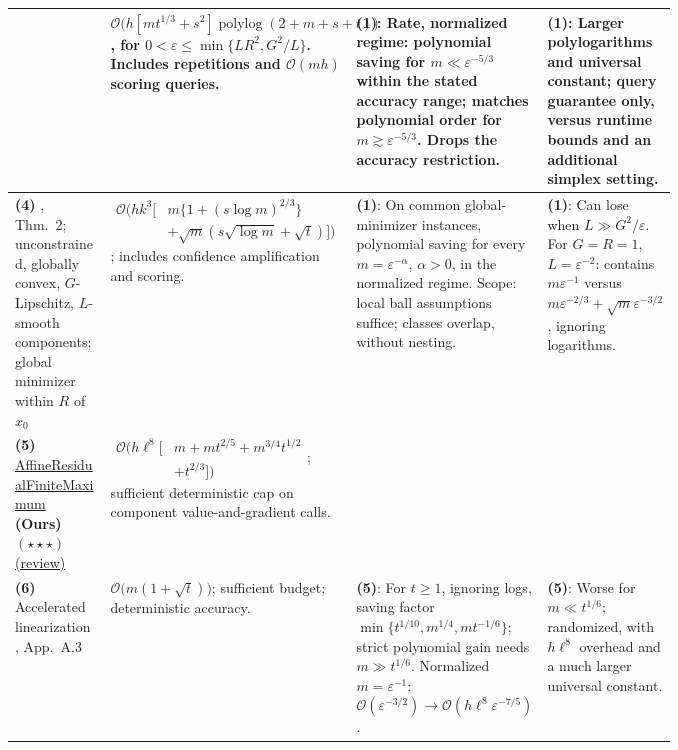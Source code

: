 \begin{table}[tp]
\begin{threeparttable}
\begin{tabularx}{\linewidth}{@{}>{\raggedright\arraybackslash}p{0.20\linewidth}>{\raggedright\arraybackslash}p{0.32\linewidth}>{\raggedright\arraybackslash}p{0.25\linewidth}>{\raggedright\arraybackslash}X@{}}
& $\mathcal{O}\bigl(h[mt^{1/3}+s^2]\operatorname{polylog}(2+m+s+t)\bigr)$, for $0<\varepsilon\le\min\{LR^2,G^2/L\}$. Includes repetitions and $\mathcal{O}(mh)$ scoring queries.
& \textbf{(1)}: Rate, normalized regime: polynomial saving for $m\ll\varepsilon^{-5/3}$ within the stated accuracy range; matches polynomial order for $m\gtrsim\varepsilon^{-5/3}$. Drops the accuracy restriction.
& \textbf{(1)}: Larger polylogarithms and universal constant; query guarantee only, versus runtime bounds and an additional simplex setting. \\
\midrule
\textbf{(4)} \citep{sfmCarmon2021v1}, Thm.~2; unconstrained, globally convex, $G$-Lipschitz, $L$-smooth components; global minimizer within $R$ of $x_0$
& $\begin{aligned}\mathcal{O}\bigl(hk^3[&m\{1+(s\log m)^{2/3}\}\\&+\sqrt m(s\sqrt{\log m}+\sqrt t)]\bigr)\end{aligned}$; includes confidence amplification and scoring.
& \textbf{(1)}: On common global-minimizer instances, polynomial saving for every $m=\varepsilon^{-\alpha}$, $\alpha>0$, in the normalized regime. Scope: local ball assumptions suffice; classes overlap, without nesting.
& \textbf{(1)}: Can lose when $L\gg G^2/\varepsilon$. For $G=R=1$, $L=\varepsilon^{-2}$: contains $m\varepsilon^{-1}$ versus $m\varepsilon^{-2/3}+\sqrt m\varepsilon^{-3/2}$, ignoring logarithms. \\
\midrule
\textbf{(5)} \href{https://github.com/k3nfalt/longtails/blob/main/LongTails/Theorems/AffineResidualFiniteMaximum.lean}{Affine\allowbreak Residual\allowbreak Finite\allowbreak Maximum} \textbf{(Ours)} $(\star\star\star)$ \href{https://github.com/k3nfalt/longtails/blob/main/scripts/reviews/AffineResidualFiniteMaximum.md}{(review)}
& $\begin{aligned}\mathcal{O}\bigl(h\ell^8[&m+mt^{2/5}+m^{3/4}t^{1/2}\\&+t^{2/3}]\bigr)\end{aligned}$; sufficient deterministic cap on component value-and-gradient calls.
& & \\
\midrule
\textbf{(6)} Accelerated linearization \citep{sfmCarmon2021v1}, App.~A.3
& $\mathcal{O}\bigl(m(1+\sqrt t)\bigr)$; sufficient budget; deterministic accuracy.
& \textbf{(5)}: For $t\ge1$, ignoring logs, saving factor $\min\{t^{1/10},m^{1/4},mt^{-1/6}\}$; strict polynomial gain needs $m\gg t^{1/6}$. Normalized $m=\varepsilon^{-1}$: $\mathcal{O}(\varepsilon^{-3/2})\to\mathcal{O}(h\ell^8\varepsilon^{-7/5})$.
& \textbf{(5)}: Worse for $m\ll t^{1/6}$; randomized, with $h\ell^8$ overhead and a much larger universal constant. \\

\end{tabularx}
\end{threeparttable}
\end{table}
